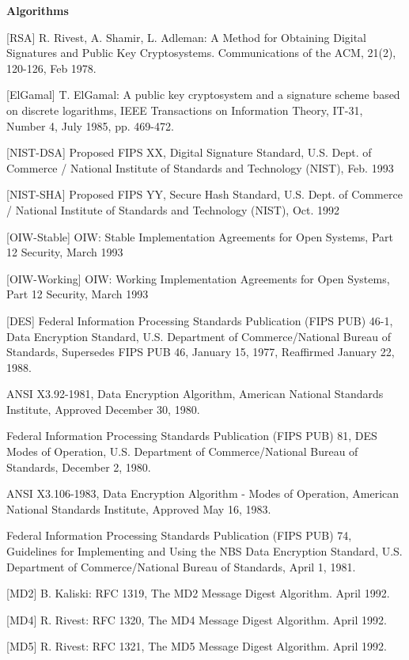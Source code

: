{\bf Algorithms}
{\small
\begin{description}
\item{[RSA]}
R. Rivest, A. Shamir, L. Adleman:
A Method  for Obtaining Digital Signatures
and Public Key Cryptosystems.
Communications of the ACM, 21(2), 120-126, Feb 1978.

\item{[ElGamal]}
T. ElGamal:  A  public key  cryptosystem  and  a signature
scheme  based  on discrete logarithms, IEEE  Transactions on
Information    Theory,  IT-31,  Number  4,  July  1985,  pp.
469-472.

\item{[NIST-DSA]}
Proposed FIPS XX, Digital Signature Standard, U.S. Dept. of Commerce /
National Institute of Standards and Technology (NIST), Feb. 1993 

\item{[NIST-SHA]}
Proposed FIPS YY, Secure Hash Standard, U.S. Dept. of Commerce /
National Institute of Standards and Technology (NIST), Oct. 1992 

\item{[OIW-Stable]}
OIW: Stable Implementation Agreements for Open Systems, 
Part 12 Security, March 1993

\item{[OIW-Working]}
OIW: Working Implementation Agreements for Open Systems, 
Part 12 Security, March 1993

\item{[DES]}
Federal Information  Processing Standards Publication  (FIPS
PUB)   46-1, Data  Encryption Standard,  U.S. Department  of
Commerce/National Bureau  of Standards, Supersedes  FIPS PUB
46,  January 15, 1977, Reaffirmed January 22, 1988. 

ANSI   X3.92-1981,  Data   Encryption  Algorithm,   American
National  Standards Institute, Approved December 30, 1980. 

Federal Information  Processing Standards  Publication (FIPS
PUB)    81,  DES  Modes  of Operation,  U.S.  Department  of
Commerce/National Bureau of Standards, December 2, 1980. 

ANSI  X3.106-1983,  Data  Encryption  Algorithm -  Modes  of
Operation, American  National Standards  Institute, Approved
May  16, 1983. 

Federal Information  Processing Standards  Publication (FIPS
PUB)  74, Guidelines for Implementing and Using the NBS Data
Encryption  Standard, U.S.  Department of  Commerce/National
Bureau of Standards, April 1, 1981.

\item{[MD2]}
B. Kaliski: RFC 1319,
The MD2 Message Digest Algorithm.
April 1992.

\item{[MD4]}
R. Rivest: RFC 1320,
The MD4 Message Digest Algorithm.
April 1992.

\item{[MD5]}
R. Rivest: RFC 1321,
The MD5 Message Digest Algorithm.
April 1992.
\end{description}
}

